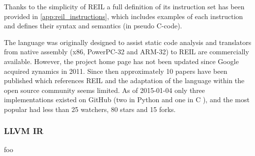 
Thanks to the simplicity of REIL a full definition of its instruction set has been provided in \cref{app:reil_instructions}, which includes examples of each instruction and defines their syntax and semantics (in pseudo C-code).


The language was originally designed to assist static code analysis and translators from native assembly (x86, PowerPC-32 and ARM-32) to REIL are commercially available. However, the project home page has not been updated since Google acquired zynamics in 2011. Since then approximately 10 papers have been published which references REIL and the adaptation of the language within the open source community seems limited. As of 2015-01-04 only three implementations existed on GitHub (two in Python \cite{barf,pyreil} and one in C \cite{bit}), and the most popular had less than 25 watchers, 80 stars and 15 forks.


\subsubsection{LLVM IR}

foo
